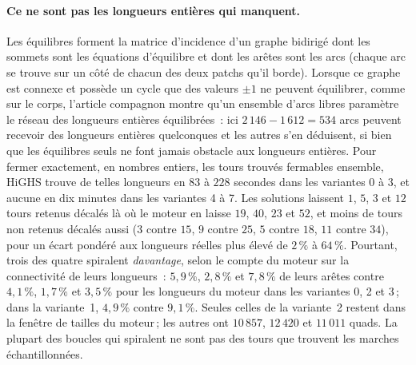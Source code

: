 \documentclass[11pt,a4paper]{article}
\begin{document}
\paragraph{Ce ne sont pas les longueurs entières qui manquent.}
Les équilibres forment la matrice d'incidence d'un graphe bidirigé dont les
sommets sont les équations d'équilibre et dont les arêtes sont les arcs
(chaque arc se trouve sur un côté de chacun des deux patchs qu'il borde).
Lorsque ce graphe est connexe et possède un cycle que des valeurs $\pm1$ ne
peuvent équilibrer, comme sur le corps, l'article compagnon montre qu'un
ensemble d'arcs libres paramètre le réseau des longueurs entières
équilibrées~: ici $2\,146 - 1\,612 = 534$ arcs peuvent recevoir des longueurs
entières quelconques et les autres s'en déduisent, si bien que les
équilibres seuls ne font jamais obstacle aux longueurs entières. Pour fermer
exactement, en nombres entiers, les tours trouvés fermables ensemble, HiGHS
trouve de telles longueurs en $83$ à $228$ secondes dans les variantes 0 à
3, et aucune en dix minutes dans les variantes 4 à 7. Les solutions laissent
$1$, $5$, $3$ et $12$ tours retenus décalés là où le moteur en laisse $19$,
$40$, $23$ et $52$, et moins de tours non retenus décalés aussi ($3$ contre
$15$, $9$ contre $25$, $5$ contre $18$, $11$ contre $34$), pour un écart
pondéré aux longueurs réelles plus élevé de $2\,\%$ à $64\,\%$. Pourtant,
trois des quatre spiralent \emph{davantage}, selon le compte du moteur sur
la connectivité de leurs longueurs~: $5,9\,\%$, $2,8\,\%$ et $7,8\,\%$ de
leurs arêtes contre $4,1\,\%$, $1,7\,\%$ et $3,5\,\%$ pour les longueurs du
moteur dans les variantes 0, 2 et 3\,; dans la variante~1, $4,9\,\%$ contre
$9,1\,\%$. Seules celles de la variante~2 restent dans la fenêtre de tailles
du moteur\,; les autres ont $10\,857$, $12\,420$ et $11\,011$ quads. La plupart des boucles qui spiralent ne sont pas des tours que
trouvent les marches échantillonnées.
\end{document}
